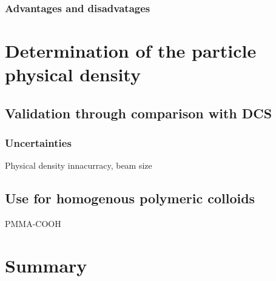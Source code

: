 \subsubsection{Advantages and disadvatages}

\section{Determination of the particle physical density}
\subsection{Validation through comparison with DCS}
\subsubsection{Uncertainties}
Physical density innacurracy, beam size
\subsection{Use for homogenous polymeric colloids}
PMMA-COOH
\section{Summary}
